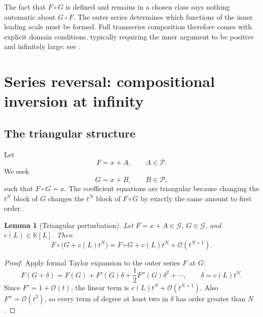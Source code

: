 \documentclass[11pt]{article}
\theoremstyle{pltheorem}
\newtheorem{lemma}[theorem]{Lemma}
\newcommand{\K}{\mathbb K}
\newcommand{\PL}{\mathscr P}
\newcommand{\Gnear}{\mathcal G}
\newcommand{\bigO}{\mathcal O}
\newcommand{\compose}{\mathbin{\circ}}
\begin{document}
\begin{warningbox}
The fact that \(F\compose G\) is defined and remains in a chosen class says nothing automatic about \(G\compose F\).  The outer series determines which functions of the inner leading scale must be formed.  Full transseries composition therefore comes with explicit domain conditions, typically requiring the inner argument to be positive and infinitely large; see \cite{edgar-composition,vanderhoeven-book}.
\end{warningbox}

\section{Series reversal: compositional inversion at infinity}
\label{sec:reversion}

\subsection{The triangular structure}

Let
\begin{equation}\label{eq:F-reversion}
 F=x+A,
 \qquad A\in\PL.
\end{equation}
We seek
\begin{equation}\label{eq:G-reversion}
 G=x+B,
 \qquad B\in\PL,
\end{equation}
such that \(F\compose G=x\).  The coefficient equations are triangular because changing the \(t^N\) block of \(G\) changes the \(t^N\) block of \(F\compose G\) by exactly the same amount to first order.

\begin{lemma}[Triangular perturbation]\label{lem:triangular-perturbation}
Let \(F=x+A\in\Gnear\), \(G\in\Gnear\), and \(c(L)\in\K[L]\).  Then
\begin{equation}\label{eq:triangular-perturbation}
 F\compose\bigl(G+c(L)t^N\bigr)
 =F\compose G+c(L)t^N+\bigO(t^{N+1}).
\end{equation}
\end{lemma}

\begin{proof}
Apply formal Taylor expansion to the outer series \(F\) at \(G\):
\[
 F(G+\delta)=F(G)+F'(G)\delta+\frac12F''(G)\delta^2+\cdots,
 \qquad \delta=c(L)t^N.
\]
Since \(F'=1+\bigO(t)\), the linear term is
\(c(L)t^N+\bigO(t^{N+1})\).  Also \(F''=\bigO(t^2)\), so every term of degree at least two in \(\delta\) has order greater than \(N\).
\end{proof}
\end{document}
